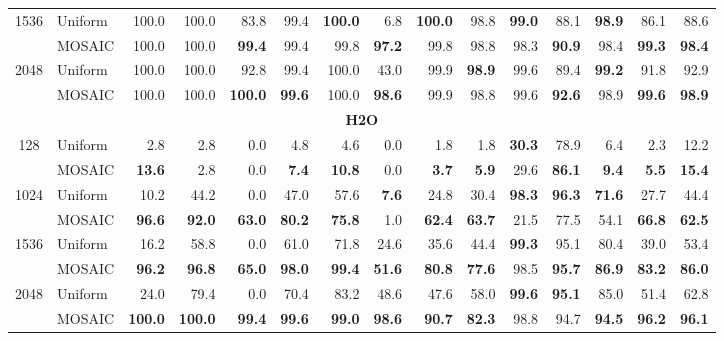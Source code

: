 \begin{table}[tp]
\begin{tabular}{@{} c l rrrrrrrrrrrrr @{}}
    \cmidrule(l){1-15}
    \multirow{2}{*}{1536} & Uniform & 100.0 & 100.0 & 83.8 & 99.4 & \textbf{100.0} & 6.8 & \textbf{100.0} & 98.8 & \textbf{99.0} & 88.1 & \textbf{98.9} & 86.1 & 88.6 \\
     & MOSAIC & 100.0 & 100.0 & \textbf{99.4} & 99.4 & 99.8 & \textbf{97.2} & 99.8 & 98.8 & 98.3 & \textbf{90.9} & 98.4 & \textbf{99.3} & \textbf{98.4} \\
    \cmidrule(l){1-15}
    \multirow{2}{*}{2048} & Uniform & 100.0 & 100.0 & 92.8 & 99.4 & 100.0 & 43.0 & 99.9 & \textbf{98.9} & 99.6 & 89.4 & \textbf{99.2} & 91.8 & 92.9 \\
     & MOSAIC & 100.0 & 100.0 & \textbf{100.0} & \textbf{99.6} & 100.0 & \textbf{98.6} & 99.9 & 98.8 & 99.6 & \textbf{92.6} & 98.9 & \textbf{99.6} & \textbf{98.9} \\
    \midrule
    \multicolumn{15}{c}{\textbf{H2O}} \\
    \midrule
    \multirow{2}{*}{128} & Uniform & 2.8 & 2.8 & 0.0 & 4.8 & 4.6 & 0.0 & 1.8 & 1.8 & \textbf{30.3} & 78.9 & 6.4 & 2.3 & 12.2 \\
     & MOSAIC & \textbf{13.6} & 2.8 & 0.0 & \textbf{7.4} & \textbf{10.8} & 0.0 & \textbf{3.7} & \textbf{5.9} & 29.6 & \textbf{86.1} & \textbf{9.4} & \textbf{5.5} & \textbf{15.4} \\
    \cmidrule(l){1-15}
    \multirow{2}{*}{1024} & Uniform & 10.2 & 44.2 & 0.0 & 47.0 & 57.6 & \textbf{7.6} & 24.8 & 30.4 & \textbf{98.3} & \textbf{96.3} & \textbf{71.6} & 27.7 & 44.4 \\
     & MOSAIC & \textbf{96.6} & \textbf{92.0} & \textbf{63.0} & \textbf{80.2} & \textbf{75.8} & 1.0 & \textbf{62.4} & \textbf{63.7} & 21.5 & 77.5 & 54.1 & \textbf{66.8} & \textbf{62.5} \\
    \cmidrule(l){1-15}
    \multirow{2}{*}{1536} & Uniform & 16.2 & 58.8 & 0.0 & 61.0 & 71.8 & 24.6 & 35.6 & 44.4 & \textbf{99.3} & 95.1 & 80.4 & 39.0 & 53.4 \\
     & MOSAIC & \textbf{96.2} & \textbf{96.8} & \textbf{65.0} & \textbf{98.0} & \textbf{99.4} & \textbf{51.6} & \textbf{80.8} & \textbf{77.6} & 98.5 & \textbf{95.7} & \textbf{86.9} & \textbf{83.2} & \textbf{86.0} \\
    \cmidrule(l){1-15}
    \multirow{2}{*}{2048} & Uniform & 24.0 & 79.4 & 0.0 & 70.4 & 83.2 & 48.6 & 47.6 & 58.0 & \textbf{99.6} & \textbf{95.1} & 85.0 & 51.4 & 62.8 \\
     & MOSAIC & \textbf{100.0} & \textbf{100.0} & \textbf{99.4} & \textbf{99.6} & \textbf{99.0} & \textbf{98.6} & \textbf{90.7} & \textbf{82.3} & 98.8 & 94.7 & \textbf{94.5} & \textbf{96.2} & \textbf{96.1} \\

\end{tabular}
\end{table}
